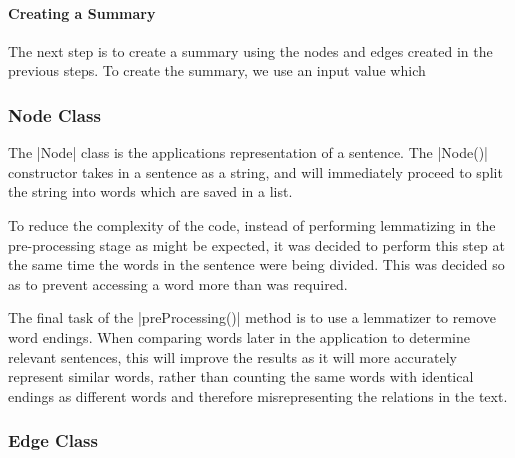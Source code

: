 	\paragraph{Creating a Summary}
	
		The next step is to create a summary using the nodes and edges created in the previous steps. To create the summary, we use an input value which 
	
	\subsubsection{Node Class}
	
		The |Node| class is the applications representation of a sentence. The |Node()| constructor takes in a sentence as a string, and will immediately proceed to split the string into words which are saved in a list. 
		
		To reduce the complexity of the code, instead of performing lemmatizing in the pre-processing stage as might be expected, it was decided to perform this step at the same time the words in the sentence were being divided. This was decided so as to prevent accessing a word more than was required.
		
		The final task of the |preProcessing()| method is to use a lemmatizer to remove word endings. When comparing words later in the application to determine relevant sentences, this will improve the results as it will more accurately represent similar words, rather than counting the same words with identical endings as different words and therefore misrepresenting the relations in the text.
		
	
	\subsubsection{Edge Class}
	
	
	
